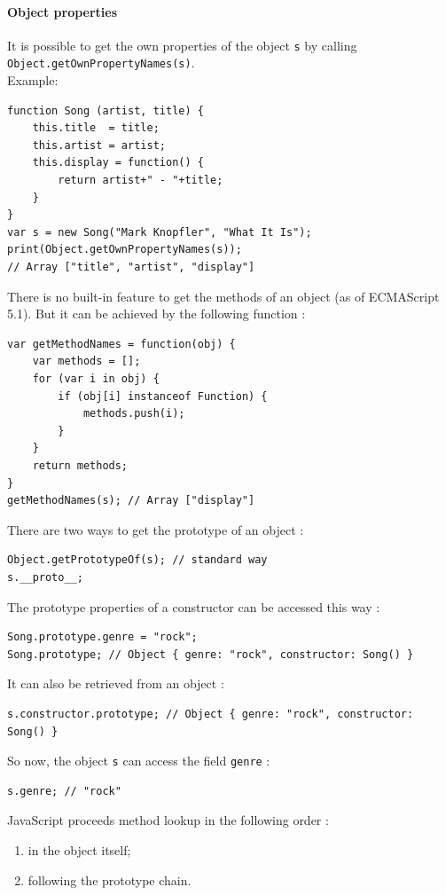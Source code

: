 \documentclass[a4paper,10pt]{article}
\begin{document}
\paragraph{Object properties}{
It is possible to get the own properties of the object \lstinline|s| by calling \lstinline|Object.getOwnPropertyNames(s)|. \\
Example:
\begin{lstlisting}
function Song (artist, title) {
    this.title  = title;
    this.artist = artist;
    this.display = function() {
        return artist+" - "+title;
    }
}
var s = new Song("Mark Knopfler", "What It Is");
print(Object.getOwnPropertyNames(s));
// Array ["title", "artist", "display"]
\end{lstlisting}
}


There is no built-in feature to get the methods of an object (as of ECMAScript 5.1). But it can be achieved by the following function :
\begin{lstlisting}
var getMethodNames = function(obj) {
    var methods = [];
    for (var i in obj) {
        if (obj[i] instanceof Function) {
            methods.push(i);
        }
    }
    return methods;
}
getMethodNames(s); // Array ["display"]
\end{lstlisting}


There are two ways to get the prototype of an object :
\begin{lstlisting}
Object.getPrototypeOf(s); // standard way
s.__proto__;
\end{lstlisting}


The prototype properties of a constructor can be accessed this way :
\begin{lstlisting}
Song.prototype.genre = "rock";
Song.prototype; // Object { genre: "rock", constructor: Song() }
\end{lstlisting}

It can also be retrieved from an object :
\begin{lstlisting}
s.constructor.prototype; // Object { genre: "rock", constructor: Song() }
\end{lstlisting}

So now, the object \lstinline|s| can access the field \lstinline|genre| :
\begin{lstlisting}
s.genre; // "rock"
\end{lstlisting}

JavaScript proceeds method lookup in the following order :
\begin{enumerate}
\item in the object itself;
\item following the prototype chain.
\end{enumerate}
\end{document}
